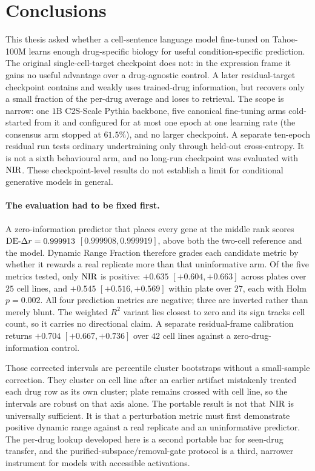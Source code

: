 \section{Conclusions}
\label{sec:conclusions}

This thesis asked whether a cell-sentence language model fine-tuned on Tahoe-100M learns enough
drug-specific biology for useful condition-specific prediction. The original single-cell-target
checkpoint does not: in the expression frame it gains no useful advantage over a drug-agnostic
control. A later residual-target checkpoint contains and weakly uses trained-drug information, but
recovers only a small fraction of the per-drug average and loses to retrieval. The scope is narrow:
one $1$B C2S-Scale Pythia backbone, five canonical fine-tuning arms cold-started from it and
configured for at most one epoch at one learning rate (the consensus arm stopped at $61.5\%$), and
no larger checkpoint. A separate ten-epoch residual run tests ordinary undertraining only through
held-out cross-entropy. It is not a sixth behavioural arm, and no long-run checkpoint was evaluated
with $\textrm{NIR}$. These checkpoint-level results do not establish a limit for conditional generative
models in general.

\paragraph{The evaluation had to be fixed first.} A zero-information predictor that places every
gene at the middle rank scores $\textrm{DE-}\Delta r=0.999913$ \nolinebreak[3]$[0.999908,0.999919]$, above both the
two-cell reference and the model. Dynamic Range Fraction therefore grades each candidate metric by
whether it rewards a real replicate more than that uninformative arm. Of the five metrics tested,
only $\textrm{NIR}$ is positive: $+0.635$ \nolinebreak[3]$[+0.604,+0.663]$ across plates over $25$ cell
lines, and $+0.545$ \nolinebreak[3]$[+0.516,+0.569]$ within plate over $27$, each with Holm
$p=0.002$. All four prediction metrics are negative; three are inverted rather than merely blunt.
The weighted $R^2$ variant lies closest to zero and its sign tracks cell count, so it carries no
directional claim. A separate residual-frame calibration returns $+0.704$
\nolinebreak[3]$[+0.667,+0.736]$ over $42$ cell lines against a zero-drug-information control.

Those corrected intervals are percentile cluster bootstraps without a small-sample correction.
They cluster on cell line after an earlier artifact mistakenly treated each drug row as its own
cluster; plate remains crossed with cell line, so the intervals are robust on that axis alone. The
portable result is not that $\textrm{NIR}$ is universally sufficient. It is that a perturbation metric must
first demonstrate positive dynamic range against a real replicate and an uninformative predictor.
The per-drug lookup developed here is a second portable bar for seen-drug transfer, and the
purified-subspace/removal-gate protocol is a third, narrower instrument for models with accessible
activations.


